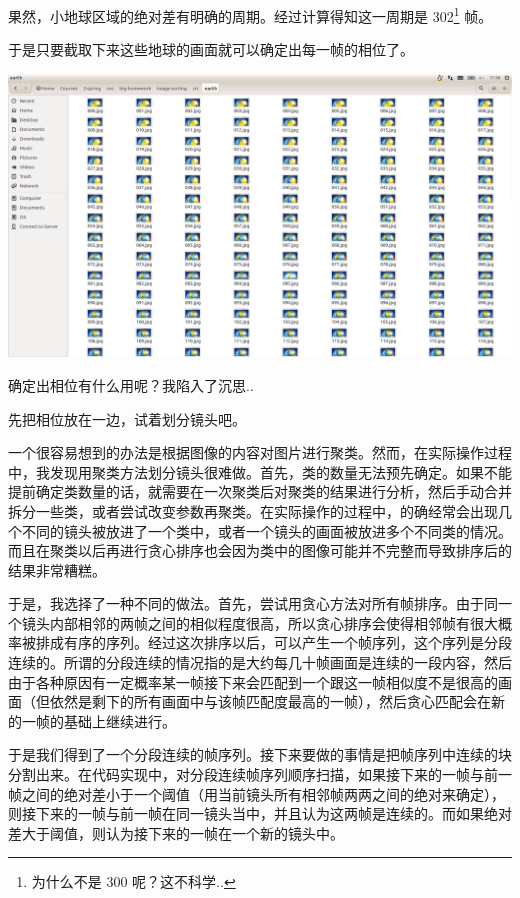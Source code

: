 \documentclass[a4paper, fontset=none]{article}
\begin{document}
果然，小地球区域的绝对差有明确的周期。经过计算得知这一周期是 302\footnote{为什么不是 300 呢？这不科学..} 帧。

于是只要截取下来这些地球的画面就可以确定出每一帧的相位了。

\begin{center}
  \includegraphics[width=\textwidth]{./many_earth.png}
\end{center}

确定出相位有什么用呢？我陷入了沉思..

先把相位放在一边，试着划分镜头吧。

一个很容易想到的办法是根据图像的内容对图片进行聚类。然而，在实际操作过程中，我发现用聚类方法划分镜头很难做。首先，类的数量无法预先确定。如果不能提前确定类数量的话，就需要在一次聚类后对聚类的结果进行分析，然后手动合并拆分一些类，或者尝试改变参数再聚类。在实际操作的过程中，的确经常会出现几个不同的镜头被放进了一个类中，或者一个镜头的画面被放进多个不同类的情况。而且在聚类以后再进行贪心排序也会因为类中的图像可能并不完整而导致排序后的结果非常糟糕。

于是，我选择了一种不同的做法。首先，尝试用贪心方法对所有帧排序。由于同一个镜头内部相邻的两帧之间的相似程度很高，所以贪心排序会使得相邻帧有很大概率被排成有序的序列。经过这次排序以后，可以产生一个帧序列，这个序列是分段连续的。所谓的分段连续的情况指的是大约每几十帧画面是连续的一段内容，然后由于各种原因有一定概率某一帧接下来会匹配到一个跟这一帧相似度不是很高的画面（但依然是剩下的所有画面中与该帧匹配度最高的一帧），然后贪心匹配会在新的一帧的基础上继续进行。

于是我们得到了一个分段连续的帧序列。接下来要做的事情是把帧序列中连续的块分割出来。在代码实现中，对分段连续帧序列顺序扫描，如果接下来的一帧与前一帧之间的绝对差小于一个阈值（用当前镜头所有相邻帧两两之间的绝对来确定），则接下来的一帧与前一帧在同一镜头当中，并且认为这两帧是连续的。而如果绝对差大于阈值，则认为接下来的一帧在一个新的镜头中。
\end{document}
